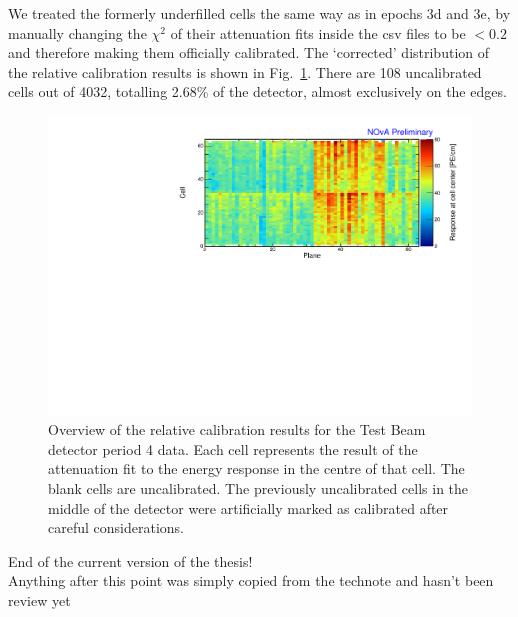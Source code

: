 We treated the formerly underfilled cells the same way as in epochs 3d and 3e, by manually changing the $\chi^2$ of their attenuation fits inside the csv files to be $<0.2$ and therefore making them officially calibrated. The `corrected' distribution of the relative calibration results is shown in Fig.~\ref{fig:CellCentreResponsePeriod4_updated}. There are 108 uncalibrated cells out of 4032, totalling 2.68\% of the detector, almost exclusively on the edges.

\begin{figure}[!hbtp]
\centering
\includegraphics[width=\textwidth]{Plots/TBCalibration/CellResponseAtCentre_period4_Limited_NOvAPlotStyle.pdf}
\caption[Corrected map of fitted response at cell centre for period 4 data]{Overview of the relative calibration results for the Test Beam detector period 4 data. Each cell represents the result of the attenuation fit to the energy response in the centre of that cell. The blank cells are uncalibrated. The previously uncalibrated cells in the middle of the detector were artificially marked as calibrated after careful considerations.}
\label{fig:CellCentreResponsePeriod4_updated}
\end{figure}

\FloatBarrier

\newpage

\begin{center}
\begin{Huge}
\vspace*{3cm}
End of the current version of the thesis!\\[2cm]
Anything after this point was simply copied from the technote and hasn't been review yet
\end{Huge}
\end{center}

